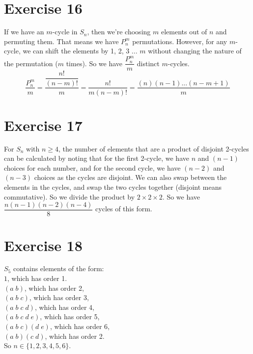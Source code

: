 \documentclass[12pt]{article}
\begin{document}
    
    \section*{Exercise 16}
    If we have an $m$-cycle in $S_n$,
    then we're choosing $m$ elements out of $n$ and permuting them.
    That means we have $P_n^m$ permutations.
    However, for any $m$-cycle, we can shift the elements by 1, 2, 3 ... $m$
    without changing the nature of the permutation ($m$ times).
    So we have $\dfrac{P_n^m}{m}$ distinct $m$-cycles.
    \[ \dfrac{P_n^m}{m} = \dfrac{\dfrac{n!}{(n - m)!}}{m}
    = \dfrac{n!}{m(n - m)!} = \dfrac{(n)(n-1)...(n - m + 1)}{m} \]


    \section*{Exercise 17}
    For $S_n$ with $n \geqslant 4$, the number of elements that are a
    product of disjoint 2-cycles can be calculated by noting that
    for the first 2-cycle, we have $n$ and $(n-1)$ choices for each number,
    and for the second cycle, we have $(n-2)$ and $(n-3)$ choices as
    the cycles are disjoint. We can also swap between the elements in the
    cycles, and swap the two cycles together (disjoint means commutative).
    So we divide the product by $2 \times 2 \times 2$.
    So we have $\dfrac{n(n-1)(n-2)(n-4)}{8}$ cycles of this form.


    \section*{Exercise 18}
    $S_5$ contains elements of the form: \\ 
    $1$, which has order 1. \\
    $(a\;b)$, which has order 2, \\
    $(a\;b\;c)$, which has order 3, \\
    $(a\;b\;c\;d)$, which has order 4, \\
    $(a\;b\;c\;d\;e)$, which has order 5, \\
    $(a\;b\;c)(d\;e)$, which has order 6, \\
    $(a\;b)(c\;d)$, which has order 2. \\
    So $n \in \{ 1, 2, 3, 4, 5, 6 \}$.
\end{document}
